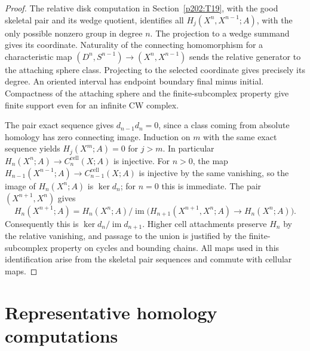\documentclass[11pt,oneside,openany]{book}
\theoremstyle{plain}
\theoremstyle{definition}
\theoremstyle{remark}
\begin{document}
\begin{proof}
The relative disk computation in Section~\ref{p202:T19}, with
the good skeletal pair and its wedge quotient, identifies all
\(H_j(X^n,X^{n-1};A)\), with the only possible nonzero group
in degree \(n\). The projection to a wedge summand gives its
coordinate. Naturality of the connecting homomorphism for a
characteristic map \((D^n,S^{n-1})\to (X^n,X^{n-1})\) sends
the relative generator to the attaching sphere class. Projecting
to the selected coordinate gives precisely its degree. An
oriented interval has endpoint boundary final minus initial.
Compactness of the attaching sphere and the finite-subcomplex
property give finite support even for an infinite CW complex.

The pair exact sequence gives \(d_{n-1}d_n=0\), since a class
coming from absolute homology has zero connecting image. Induction
on \(m\) with the same exact sequence yields \(H_j(X^m;A)=0\)
for \(j>m\). In particular
\(H_n(X^n;A)\to C_n^{\mathrm{cell}}(X;A)\) is injective.
For \(n>0\), the map
\(H_{n-1}(X^{n-1};A)\to C_{n-1}^{\mathrm{cell}}(X;A)\) is
injective by the same vanishing, so the image of
\(H_n(X^n;A)\) is \(\ker d_n\); for \(n=0\) this is immediate.
The pair \((X^{n+1},X^n)\) gives
\[
 H_n(X^{n+1};A)=
 H_n(X^n;A)/\operatorname{im}\bigl(H_{n+1}(X^{n+1},X^n;A)
               \longrightarrow H_n(X^n;A)\bigr).
\]
Consequently this is \(\ker d_n/\operatorname{im}d_{n+1}\).
Higher cell attachments preserve \(H_n\) by the relative
vanishing, and passage to the union is justified by the
finite-subcomplex property on cycles and bounding chains.
All maps used in this identification arise from the skeletal
pair sequences and commute with cellular maps.
\end{proof}

\section{Representative homology computations}\label{p202:T21}
\end{document}
